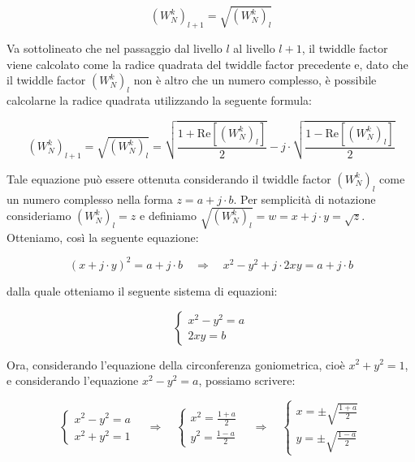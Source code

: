 \documentclass[a4paper,12pt]{report}  %
\begin{document}
\begin{equation}
    \left ( W_N^{k} \right )_{l + 1} = \sqrt{\left ( W_N^{k} \right )_l} \nonumber
\end{equation}

Va sottolineato che nel passaggio dal livello $l$ al livello $l + 1$, il twiddle factor viene calcolato come la radice quadrata del twiddle factor precedente e, dato che il twiddle factor $\left ( W_N^{k} \right )_l$ non è altro che un numero complesso, è possibile calcolarne la radice quadrata utilizzando la seguente formula:

\begin{equation}
    \label{eq:twiddle_factor}
    \left ( W_N^{k} \right )_{l + 1} = \sqrt{\left ( W_N^{k} \right )_l} = \sqrt{\frac{1 + \text{Re}\left [ \left ( W_N^{k} \right )_l \right ]}{2}} - j \cdot \sqrt{\frac{1 - \text{Re}\left [ \left ( W_N^{k} \right )_l \right ]}{2}}
\end{equation}

Tale equazione può essere ottenuta considerando il twiddle factor $\left ( W_N^{k} \right )_l$ come un numero complesso nella forma $z = a + j \cdot b$.
Per semplicità di notazione consideriamo $\left ( W_N^{k} \right )_l = z$ e definiamo $\sqrt{\left ( W_N^{k} \right )_l} = w = x + j \cdot y = \sqrt{z}$.
Otteniamo, così la seguente equazione:

\begin{equation}
    (x + j \cdot y)^2 = a + j \cdot b \quad \Longrightarrow \quad x^2 - y^2 + j \cdot 2xy = a + j \cdot b \nonumber
\end{equation}

dalla quale otteniamo il seguente sistema di equazioni:

\begin{equation}
    \begin{cases}
        x^2 - y^2 = a \\
        2xy = b
    \end{cases} \nonumber
\end{equation}

Ora, considerando l'equazione della circonferenza goniometrica, cioè $x^2 + y^2 = 1$, e considerando l'equazione $x^2 - y^2 = a$, possiamo scrivere:

\begin{equation}
    \begin{cases}
        x^2 - y^2 = a \\
        x^2 + y^2 = 1
    \end{cases} \quad \Longrightarrow \quad
    \begin{cases}
        x^2 = \frac{1 + a}{2} \\
        y^2 = \frac{1 - a}{2}
    \end{cases} \quad \Longrightarrow \quad
    \begin{cases}
        x = \pm \sqrt{\frac{1 + a}{2}} \\
        y = \pm \sqrt{\frac{1 - a}{2}}
    \end{cases} \nonumber
\end{equation}
\end{document}
